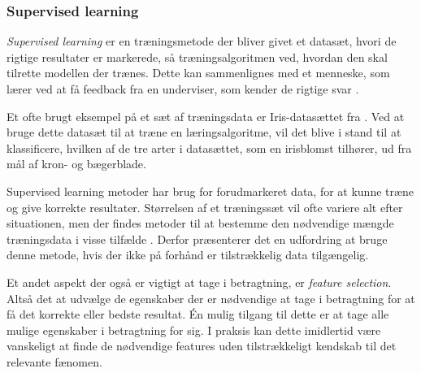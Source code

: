 \subsubsection{Supervised learning} %
\textit{Supervised learning} er en træningsmetode der bliver givet et datasæt, hvori de rigtige resultater er markerede, så træningsalgoritmen ved, hvordan den skal tilrette modellen der trænes. Dette kan sammenlignes med et menneske, som lærer ved at få feedback fra en underviser, som kender de rigtige svar \citep{Jeanmonod2018}.
\par
Et ofte brugt eksempel på et sæt af træningsdata er Iris-datasættet fra \cite{fisher1936}. Ved at bruge dette datasæt til at træne en læringsalgoritme, vil det blive i stand til at klassificere, hvilken af de tre arter i datasættet, som en irisblomst tilhører, ud fra mål af kron- og bægerblade.
\par
Supervised learning metoder har brug for forudmarkeret data, for at kunne træne og give korrekte resultater. Størrelsen af et træningssæt vil ofte variere alt efter situationen, men der findes metoder til at bestemme den nødvendige mængde træningsdata i visse tilfælde \cite{Adcock1997}. Derfor præsenterer det en udfordring at bruge denne metode, hvis der ikke på forhånd er tilstrækkelig data tilgængelig. 
\par
Et andet aspekt der også er vigtigt at tage i betragtning, er \textit{feature selection}. Altså det at udvælge de egenskaber der er nødvendige at tage i betragtning for at få det korrekte eller bedste resultat. Én mulig tilgang til dette er at tage alle mulige egenskaber i betragtning for sig. I praksis kan dette imidlertid være vanskeligt at finde de nødvendige features uden tilstrækkeligt kendskab til det relevante fænomen. 
\par

